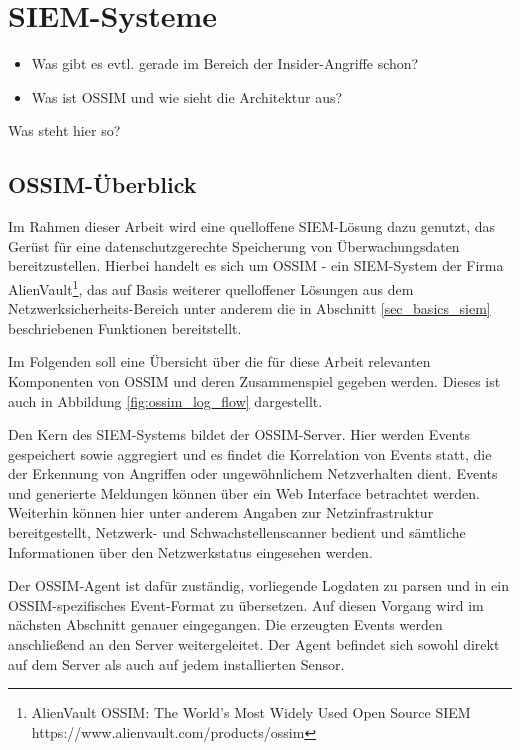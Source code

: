 \section{SIEM-Systeme}

\label{sec_state_siem}

\begin{itemize}
  \item Was gibt es evtl. gerade im Bereich der Insider-Angriffe schon?
  \item Was ist OSSIM und wie sieht die Architektur aus?
\end{itemize}


Was steht hier so?


\subsection*{OSSIM-Überblick}

Im Rahmen dieser Arbeit wird eine quelloffene SIEM-Lösung dazu genutzt, das Gerüst für eine datenschutzgerechte Speicherung von Überwachungsdaten bereitzustellen. Hierbei handelt es sich um OSSIM - ein SIEM-System der Firma AlienVault\footnote{
	AlienVault OSSIM: The World’s Most Widely Used Open Source SIEM\\https://www.alienvault.com/products/ossim
}, das auf Basis weiterer quelloffener Lösungen aus dem Netzwerksicherheits-Bereich unter anderem die in Abschnitt \ref{sec_basics_siem} beschriebenen Funktionen bereitstellt.

Im Folgenden soll eine Übersicht über die für diese Arbeit relevanten Komponenten von OSSIM und deren Zusammenspiel gegeben werden. Dieses ist auch in Abbildung \ref{fig:ossim_log_flow} dargestellt.

Den Kern des SIEM-Systems bildet der OSSIM-Server. Hier werden Events gespeichert sowie aggregiert und es findet die Korrelation von Events statt, die der Erkennung von Angriffen oder ungewöhnlichem Netzverhalten dient. Events und generierte Meldungen können über ein Web Interface betrachtet werden. Weiterhin können hier unter anderem Angaben zur Netzinfrastruktur bereitgestellt, Netzwerk- und Schwachstellenscanner bedient und sämtliche Informationen über den Netzwerkstatus eingesehen werden. 

Der OSSIM-Agent ist dafür zuständig, vorliegende Logdaten zu parsen und in ein OSSIM-spezifisches Event-Format zu übersetzen. Auf diesen Vorgang wird im nächsten Abschnitt genauer eingegangen. Die erzeugten Events werden anschließend an den Server weitergeleitet. Der Agent befindet sich sowohl direkt auf dem Server als auch auf jedem installierten Sensor. 

